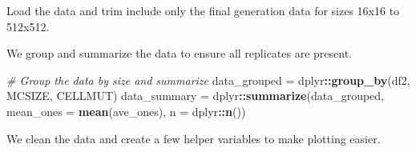 \documentclass[]{book}
\newenvironment{Shaded}{\begin{snugshade}}{\end{snugshade}}
\newcommand{\CommentTok}[1]{\textcolor[rgb]{0.56,0.35,0.01}{\textit{#1}}}
\newcommand{\DataTypeTok}[1]{\textcolor[rgb]{0.13,0.29,0.53}{#1}}
\newcommand{\DecValTok}[1]{\textcolor[rgb]{0.00,0.00,0.81}{#1}}
\newcommand{\KeywordTok}[1]{\textcolor[rgb]{0.13,0.29,0.53}{\textbf{#1}}}
\newcommand{\NormalTok}[1]{#1}
\newcommand{\OperatorTok}[1]{\textcolor[rgb]{0.81,0.36,0.00}{\textbf{#1}}}
\newcommand{\StringTok}[1]{\textcolor[rgb]{0.31,0.60,0.02}{#1}}
\begin{document}
Load the data and trim include only the final generation data for sizes 16x16 to 512x512.

\begin{Shaded}
\end{Shaded}

We group and summarize the data to ensure all replicates are present.

\begin{Shaded}
\begin{Highlighting}[]
\CommentTok{# Group the data by size and summarize}
\NormalTok{data_grouped =}\StringTok{ }\NormalTok{dplyr}\OperatorTok{::}\KeywordTok{group_by}\NormalTok{(df2, MCSIZE, CELLMUT)}
\NormalTok{data_summary =}\StringTok{ }\NormalTok{dplyr}\OperatorTok{::}\KeywordTok{summarize}\NormalTok{(data_grouped, }\DataTypeTok{mean_ones =} \KeywordTok{mean}\NormalTok{(ave_ones), }\DataTypeTok{n =}\NormalTok{ dplyr}\OperatorTok{::}\KeywordTok{n}\NormalTok{())}
\end{Highlighting}
\end{Shaded}

We clean the data and create a few helper variables to make plotting easier.
\end{document}
